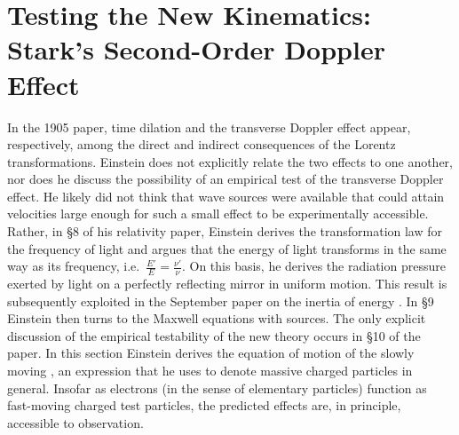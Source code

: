 \documentclass[pdflatex]{sn-jnl} %
\providecommand{\DIFaddbegin}{} %
\providecommand{\DIFaddend}{} %
\providecommand{\DIFdelbegin}{} %
\providecommand{\DIFdelend}{} %
\begin{document}
\DIFdelbegin %
\DIFdelend \DIFaddbegin \section{Testing the New Kinematics: Stark’s Second-Order Doppler Effect}
\DIFaddend 



In the 1905 paper, time dilation and the transverse Doppler effect appear, respectively, among the direct and indirect consequences of the Lorentz transformations. Einstein does not explicitly relate the two effects to one another, nor does he discuss the possibility of an empirical test of the transverse Doppler effect. He likely did not think that wave sources were available that could attain velocities large enough for such a small effect to be experimentally accessible. Rather, in \S8 of his relativity paper, Einstein derives the transformation law for the frequency of light and argues that the energy of light transforms in the same way as its frequency, i.e.\ $\frac{E'}{E}=\frac{\nu'}{\nu}$. On this basis, he derives the radiation pressure exerted by light on a perfectly reflecting mirror in uniform motion. This result is subsequently exploited in the September paper on the inertia of energy \citep{Einstein1905b}. In \S9 Einstein then turns to the Maxwell equations with sources. The only explicit discussion of the empirical testability of the new theory occurs in \S10 of the paper. In this section Einstein derives the equation of motion of the slowly moving , an expression that he uses to denote massive charged particles in general. Insofar as electrons (in the sense of elementary particles) function as fast-moving charged test particles, the predicted effects are, in principle, accessible to observation.
\end{document}
